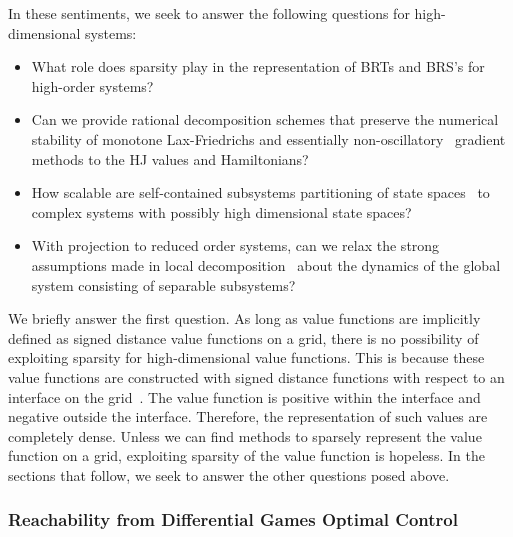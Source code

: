In these sentiments, we seek to answer the following questions for high-dimensional systems: 
%
\begin{itemize}
	\item What role does sparsity play in the representation of BRTs and BRS's for high-order systems?
	\item Can we provide rational decomposition schemes that preserve the  numerical stability of monotone Lax-Friedrichs and essentially non-oscillatory~\cite{OsherShuENO} gradient methods to the HJ values and Hamiltonians?
	\item How scalable are self-contained subsystems partitioning of state spaces~\cite{DecompChenHerbert} to complex systems with possibly high dimensional state spaces?
	\item With projection to reduced order systems, can we relax the strong assumptions made in local decomposition~\cite{FasTrack, DecompChenHerbert} \eg about the dynamics of the global system consisting of separable subsystems?
\end{itemize}
%
We briefly answer the first question. As long as value functions are implicitly defined as signed distance value functions on a grid, there is no possibility of exploiting sparsity for high-dimensional value functions. This is because these value functions are constructed with  signed distance functions with respect to an interface on the grid~\cite[Chapter 2]{LevelSetsBook}. The value function is positive within the interface and negative outside the interface. Therefore, the representation of such values are completely dense. Unless we can find methods to sparsely represent the value function on a grid, exploiting sparsity of the value function is hopeless. In the sections that follow, we seek to answer the other questions posed above.

\subsubsection{Reachability from Differential Games Optimal Control}

